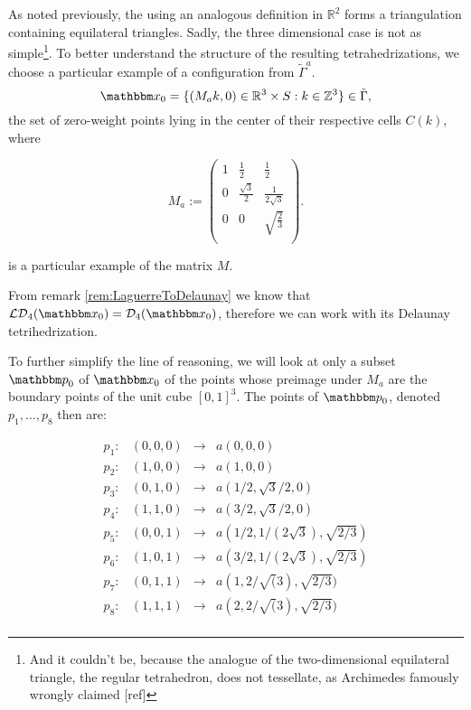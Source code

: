 \begin{remark}
As noted previously, the using an analogous definition in $\mathbb R^2$ forms a triangulation containing equilateral triangles. Sadly, the three dimensional case is not as simple\footnote{And it couldn't be, because the analogue of the two-dimensional equilateral triangle, the regular tetrahedron, does not tessellate, as Archimedes famously wrongly claimed [ref]}.
To better understand the structure of the resulting tetrahedrizations, we choose a particular example of a configuration from $\tilde\Gamma^a$. 
$$\x_0 = \{(M_ak,0) \in \Rt\times S: k \in \mathbb Z^3\} \in \tilde\Gamma,$$ 
the set of zero-weight points lying in the center of their respective cells $C(k)$, where

$$
M_a := \begin{pmatrix}
1 & \frac 12 & \frac 12 \\
0 & \frac {\sqrt{3}}2 & \frac 1{2\sqrt{3}}  \\
0 & 0 & \sqrt{\frac 23} \\
\end{pmatrix}.
$$

is a particular example of the matrix $M$.

From remark \ref{rem:LaguerreToDelaunay} we know that $\mathcal {LD}_4(\x_0) = \mathcal D_4(\x_0)$, therefore we can work with its Delaunay tetrihedrization.

To further simplify the line of reasoning, we will look at only a subset $\p_0$ of $\x_0$ of the points whose preimage under $M_a$ are the boundary points of the unit cube $[0,1]^3$. The points of $\p_0$, denoted $p_1, \dots, p_8$ then are:


$$\begin{matrix}
	p_1: & (0,0,0) & \rightarrow & a(0,0,0) \\
	p_2: & (1,0,0) & \rightarrow & a(1,0,0)\\
	p_3: & (0,1,0) & \rightarrow & a(1/2,\sqrt{3}/2,0)\\
	p_4: & (1,1,0) & \rightarrow & a(3/2,\sqrt{3}/2,0)\\

	p_5: & (0,0,1) & \rightarrow & a(1/2,1/(2\sqrt{3}),\sqrt{2/3})\\
	p_6: & (1,0,1) & \rightarrow & a(3/2,1/(2\sqrt{3}),\sqrt{2/3})\\
	p_7: & (0,1,1) & \rightarrow & a(1,2/\sqrt(3), \sqrt{2/3})\\
	p_8: & (1,1,1) & \rightarrow & a(2,2/\sqrt(3), \sqrt{2/3})\\
\end{matrix}$$


\end{remark}
